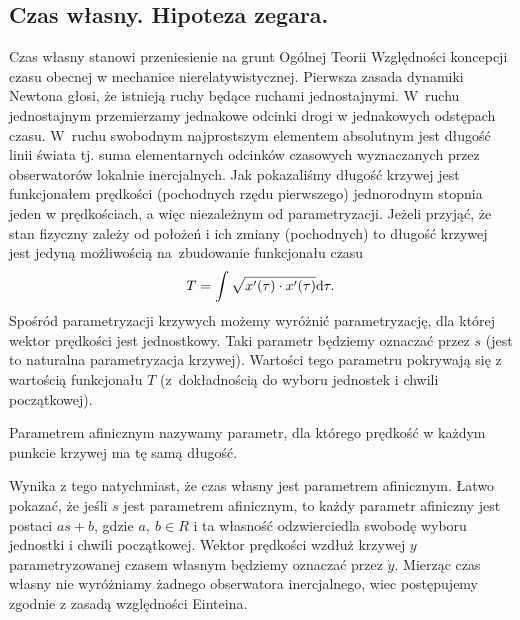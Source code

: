 \subsection{Czas własny. Hipoteza zegara.}
Czas własny stanowi przeniesienie na grunt Ogólnej Teorii Względności 
koncepcji czasu obecnej w mechanice nierelatywistycznej.
Pierwsza zasada dynamiki Newtona głosi, że istnieją ruchy będące ruchami
jednostajnymi.  W~ruchu jednostajnym przemierzamy 
jednakowe odcinki drogi w jednakowych odstępach czasu. 
W~ruchu swobodnym najprostszym elementem absolutnym jest 
długość linii świata tj. suma elementarnych 
odcinków czasowych wyznaczanych przez obserwatorów
lokalnie inercjalnych. Jak pokazaliśmy długość krzywej jest funkcjonałem 
prędkości (pochodnych rzędu pierwszego) jednorodnym stopnia jeden w 
prędkościach, a więc niezależnym od parametryzacji. 
Jeżeli przyjąć, że stan fizyczny zależy 
od położeń i ich zmiany (pochodnych) to długość krzywej jest 
jedyną możliwością na~zbudowanie funkcjonału czasu
\begin{align*}
T = \int \sqrt{x'(\tau) \cdot x'(\tau)} \text{d} \tau.
\end{align*}
Spośród parametryzacji krzywych 
 możemy wyróżnić parametryzację, 
dla której wektor prędkości jest 
jednostkowy. Taki parametr będziemy oznaczać przez $s$ 
(jest to naturalna parametryzacja krzywej). 
Wartości tego parametru pokrywają się z wartością funkcjonału $T$
(z~dokładnością do wyboru jednostek i chwili początkowej). 
\begin{definition}
Parametrem afinicznym nazywamy parametr, dla którego 
prędkość w każdym punkcie krzywej ma tę samą długość.
\end{definition}
Wynika z tego natychmiast, że czas własny jest parametrem afinicznym.
Łatwo pokazać, że jeśli $s$ jest 
parametrem afinicznym, to każdy parametr afiniczny 
jest postaci $a s+b$, gdzie $a,\ b\in R$ i ta własność odzwierciedla
swobodę wyboru jednostki i chwili początkowej.
Wektor prędkości wzdłuż krzywej $y$ parametryzowanej czasem 
własnym będziemy oznaczać przez $\dot{y}$.
Mierząc czas własny nie wyróżniamy żadnego obserwatora inercjalnego,
 wiec postępujemy zgodnie z zasadą względności Einteina. 


